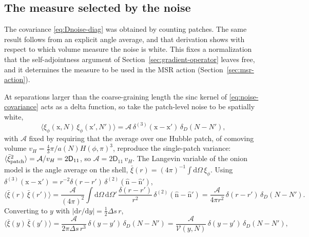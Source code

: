 \documentclass[a4paper,11pt]{article}
\newcommand{\semibold}[1]{{\fontseries{b}\selectfont{#1}}}
\renewcommand{\d}{\mathrm{d}}
\newcommand{\vect}[1]{\bm{\mathrm{{#1}}}}
\newenvironment{calculation}{\begin{tcolorbox}[enhanced,breakable,colback=SussexPowderBlue!10,colframe=SussexCobaltBlue!30]\small}{\end{tcolorbox}}
\newcommand{\Ny}{N}                          %
\newcommand{\Hub}{H}                         %
\newcommand{\sfactor}{a}                     %
\newcommand{\atloc}{(\field,\mom)}           %
\newcommand{\field}{\phi}                    %
\newcommand{\mom}{\pi}                       %
\newcommand{\noise}[1]{\xi_{#1}}             %
\newcommand{\rad}{r}                         %
\newcommand{\yco}{y}                         %
\newcommand{\aHloc}{\sfactor(\Ny)\Hub\atloc} %
\newcommand{\Deltas}{\Delta s}                %
\newcommand{\Dcm}[1]{\mathsf{D}_{#1}}        %
\newcommand{\volel}{\mathcal{V}}             %
\newcommand{\vH}{v_H}                        %
\begin{document}
\subsection{The measure selected by the noise}
\label{sec:noise-measure}

The covariance \eqref{eq:Dnoise-diag} was obtained by counting patches.
The same result follows from an explicit angle average, and that
derivation shows with respect to which volume measure the noise is white.
This fixes a normalization that the self-adjointness argument of
Section~\ref{sec:gradient-operator} leaves free, and it determines the
measure to be used in the MSR action (Section~\ref{sec:msr-action}).

\begin{calculation}
\semibold{Angle-averaged noise correlator.} At separations larger than the
coarse-graining length the sinc kernel of \eqref{eq:noise-covariance} acts
as a delta function, so take the patch-level noise to be spatially white,
\begin{equation}
    \big\langle\noise{\field}(\vect{x},\Ny)\,\noise{\field}(\vect{x}',\Ny')\big\rangle
    = \mathcal{A}\,\delta^{(3)}(\vect{x}-\vect{x}')\,\delta_D(\Ny-\Ny') ,
\end{equation}
with $\mathcal{A}$ fixed by requiring that the average over one Hubble
patch, of comoving volume $\vH = \tfrac43\pi/\aHloc^3$, reproduce the
single-patch variance: $\langle\bar\xi_{\rm patch}^2\rangle = \mathcal{A}/\vH = 2\Dcm{11}$,
so $\mathcal{A} = 2\Dcm{11}\,\vH$. The Langevin variable of the onion model
is the angle average on the shell, $\bar\xi(\rad) = (4\pi)^{-1}\int\d\Omega\,\noise{\field}$.
Using $\delta^{(3)}(\vect{x}-\vect{x}') = \rad^{-2}\delta(\rad-\rad')\,\delta^{(2)}(\hat{\vect{n}}-\hat{\vect{n}}')$,
\begin{equation}
    \big\langle\bar\xi(\rad)\,\bar\xi(\rad')\big\rangle
    = \frac{\mathcal{A}}{(4\pi)^2}\int\d\Omega\,\d\Omega'\,
      \frac{\delta(\rad-\rad')}{\rad^2}\,\delta^{(2)}(\hat{\vect{n}}-\hat{\vect{n}}')
    = \frac{\mathcal{A}}{4\pi\rad^2}\,\delta(\rad-\rad')\,\delta_D(\Ny-\Ny') .
\end{equation}
Converting to $\yco$ with $|\d\rad/\d\yco| = \tfrac12\Deltas\,\rad$,
\begin{equation}
    \big\langle\bar\xi(\yco)\,\bar\xi(\yco')\big\rangle
    = \frac{\mathcal{A}}{2\pi\Deltas\,\rad^3}\,\delta(\yco-\yco')\,\delta_D(\Ny-\Ny')
    = \frac{\mathcal{A}}{\volel(\yco,\Ny)}\,\delta(\yco-\yco')\,\delta_D(\Ny-\Ny') ,
    \label{eq:noise-angle-averaged}
\end{equation}

\end{calculation}
\end{document}
